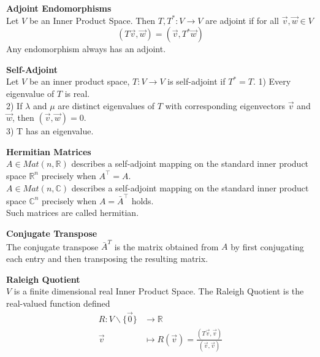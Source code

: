 \documentclass[a4paper, 10pt]{article}
\begin{document}
\begin{multicols*}{3}
\textbf{Adjoint Endomorphisms}\\
Let $V$ be an Inner Product Space. Then $T, T^*: V \rightarrow V$ are adjoint if for all $\vec{v}, \vec{w} \in V$
$$
(T \vec{v}, \vec{w})=(\vec{v}, T^* \vec{w})
$$
Any endomorphism always has an adjoint.

\textbf{Self-Adjoint}\\
Let $V$ be an inner product space, $T: V \rightarrow V$ is self-adjoint if $T^*=T$.
1) Every eigenvalue of $T$ is real.\\
2) If $\lambda$ and $\mu$ are distinct eigenvalues of $T$ with corresponding eigenvectors $\vec{v}$ and $\vec{w}$, then $(\vec{v}, \vec{w})=0$.\\
3) T has an eigenvalue.

\textbf{Hermitian Matrices}\\
$A\in Mat(n, \mathbb{R})$ describes a self-adjoint mapping on the standard inner product space $\mathbb{R}^n$ precisely when $A^{\top}=A$. \\
$A\in Mat(n, \mathbb{C})$ describes a self-adjoint mapping on the standard inner product space $\mathbb{C}^n$ precisely when $A=\bar{A}^{\top}$ holds. \\
Such matrices are called hermitian.

\textbf{Conjugate Transpose}\\
The conjugate transpose $\bar{A}^T$ is the matrix obtained from $A$ by first conjugating each entry and then transposing the resulting matrix. 

\textbf{Raleigh Quotient}\\
$V$ is a finite dimensional real Inner Product Space. 
The Raleigh Quotient is the real-valued function defined 
\begin{align*}
R: V \backslash\{\overrightarrow{0}\} &\rightarrow \mathbb{R}\\
\vec{v} &\mapsto R(\vec{v})=\frac{(T \vec{v}, \vec{v})}{(\vec{v}, \vec{v})}
\end{align*}


\end{multicols*}
\end{document}
